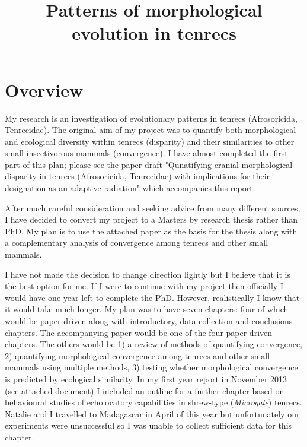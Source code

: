 \documentclass[12pt,a4paper]{article}
\begin{document}
\title{Patterns of morphological evolution in tenrecs}
\author{}
\date{}
\maketitle


\renewcommand{\headrulewidth}{0.0pt}
\thispagestyle{fancy}				%
\chead{}


\section{Overview}

	My research is an investigation of evolutionary patterns in tenrecs (Afrosoricida,  Tenrecidae). The original aim of my project was to quantify both morphological and ecological diversity within tenrecs (disparity) and their similarities to other small insectivorous mammals (convergence). I have almost completed the first part of this plan; please see the paper draft "Qunatifying cranial morphological disparity in tenrecs (Afrosoricida, Tenrecidae) with implications for their designation as an adaptive radiation" which accompanies this report.

	After much careful consideration and seeking advice from many different sources, I have decided to convert my project to a Masters by research thesis rather than PhD. My plan is to use the attached paper as the basis for the thesis along with a complementary analysis of convergence among tenrecs and other small mammals. 

	I have not made the decision to change direction lightly but I believe that it is the best option for me. If I were to continue with my project then officially I would have one year left to complete the PhD. However, realistically I know that it would take much longer. My plan was to have seven chapters: four of which would be paper driven along with introductory, data collection and conclusions chapters. The accompanying paper would be one of the four paper-driven chapters. The others would be 1) a review of methods of quantifying convergence, 2) quantifying morphological convergence among tenrecs and other small mammals using multiple methods, 3) testing whether morphological convergence is predicted by ecological similarity. In my first year report in November 2013 (see attached document) I included an outline for a further chapter based on behavioural studies of echolocatory capabilities in shrew-type (\textit{Microgale}) tenrecs. Natalie and I travelled to Madagascar in April of this year but unfortunately our experiments were unsuccessful so I was unable to collect sufficient data for this chapter.
\end{document}
